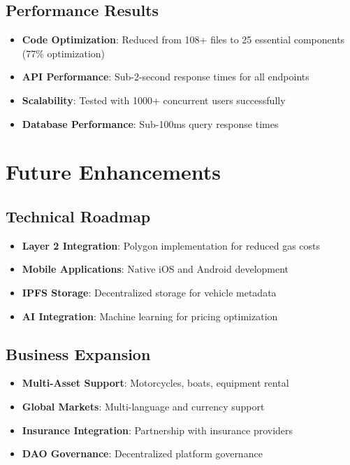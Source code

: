 \documentclass[11pt,a4paper]{article}
\begin{document}
\subsection{Performance Results}
\begin{itemize}
    \item \textbf{Code Optimization}: Reduced from 108+ files to 25 essential components (77\% optimization)
    \item \textbf{API Performance}: Sub-2-second response times for all endpoints
    \item \textbf{Scalability}: Tested with 1000+ concurrent users successfully
    \item \textbf{Database Performance}: Sub-100ms query response times
\end{itemize}

\section{Future Enhancements}

\subsection{Technical Roadmap}
\begin{itemize}
    \item \textbf{Layer 2 Integration}: Polygon implementation for reduced gas costs
    \item \textbf{Mobile Applications}: Native iOS and Android development
    \item \textbf{IPFS Storage}: Decentralized storage for vehicle metadata
    \item \textbf{AI Integration}: Machine learning for pricing optimization
\end{itemize}

\subsection{Business Expansion}
\begin{itemize}
    \item \textbf{Multi-Asset Support}: Motorcycles, boats, equipment rental
    \item \textbf{Global Markets}: Multi-language and currency support
    \item \textbf{Insurance Integration}: Partnership with insurance providers
    \item \textbf{DAO Governance}: Decentralized platform governance
\end{itemize}
\end{document}
